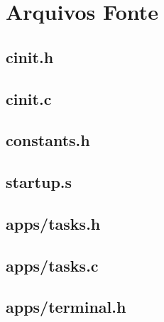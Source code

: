 \chapter{Arquivos Fonte} \label{chap:code}

\section{cinit.h} \label{sec:cinit.h}


\section{cinit.c} \label{sec:cinit.c}


\section{constants.h} \label{sec:constants.h}


\section{startup.s} \label{sec:startup.s}



\section{apps/tasks.h} \label{sec:tasks.h}


\section{apps/tasks.c} \label{sec:tasks.c}


\section{apps/terminal.h} \label{sec:terminal.h}


